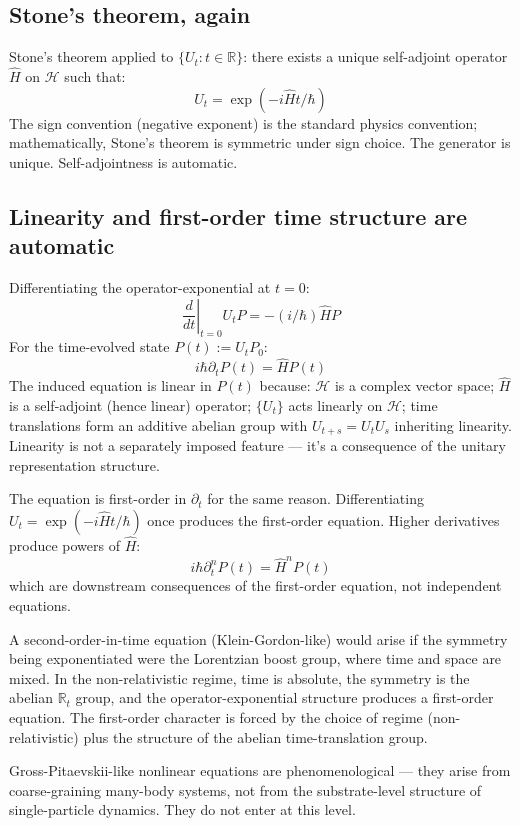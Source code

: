 \documentclass[11pt,a4paper]{article}
\begin{document}
\subsection{Stone's theorem, again}

Stone's theorem applied to $\{U_t : t \in \mathbb{R}\}$: there exists a unique self-adjoint operator $\hat{H}$ on $\mathcal{H}$ such that:
\[
U_t = \exp(-i \hat{H} t / \hbar)
\]
The sign convention (negative exponent) is the standard physics convention; mathematically, Stone's theorem is symmetric under sign choice. The generator is unique. Self-adjointness is automatic.

\subsection{Linearity and first-order time structure are automatic}

Differentiating the operator-exponential at $t = 0$:
\[
\left.\frac{d}{dt}\right|_{t=0} U_t P = -(i/\hbar) \hat{H} P
\]
For the time-evolved state $P(t) := U_t P_0$:
\[
i\hbar \partial_t P(t) = \hat{H} P(t)
\]
The induced equation is linear in $P(t)$ because: $\mathcal{H}$ is a complex vector space; $\hat{H}$ is a self-adjoint (hence linear) operator; $\{U_t\}$ acts linearly on $\mathcal{H}$; time translations form an additive abelian group with $U_{t+s} = U_t U_s$ inheriting linearity. Linearity is not a separately imposed feature --- it's a consequence of the unitary representation structure.

The equation is first-order in $\partial_t$ for the same reason. Differentiating $U_t = \exp(-i\hat{H}t/\hbar)$ once produces the first-order equation. Higher derivatives produce powers of $\hat{H}$:
\[
i\hbar \partial_t^n P(t) = \hat{H}^n P(t)
\]
which are downstream consequences of the first-order equation, not independent equations.

A second-order-in-time equation (Klein-Gordon-like) would arise if the symmetry being exponentiated were the Lorentzian boost group, where time and space are mixed. In the non-relativistic regime, time is absolute, the symmetry is the abelian $\mathbb{R}_t$ group, and the operator-exponential structure produces a first-order equation. The first-order character is forced by the choice of regime (non-relativistic) plus the structure of the abelian time-translation group.

Gross-Pitaevskii-like nonlinear equations are phenomenological --- they arise from coarse-graining many-body systems, not from the substrate-level structure of single-particle dynamics. They do not enter at this level.
\end{document}
